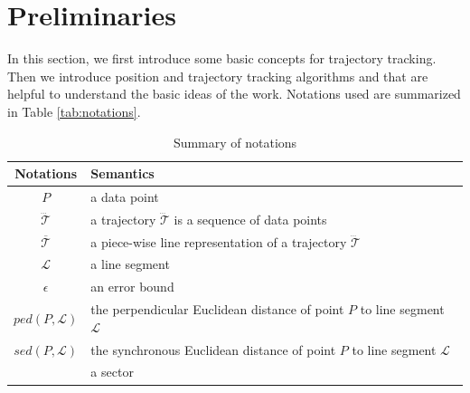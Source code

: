 



\section{Preliminaries}
\label{sec-pre}

In this section, we first introduce some basic concepts for trajectory tracking.
Then we introduce position and trajectory tracking algorithms \ldr and \ldrh that are helpful to understand the basic ideas of the work.
Notations used are summarized in Table \ref{tab:notations}.

\begin{table}
	\renewcommand{\arraystretch}{1.20}
	\caption{\small Summary of notations}
	\vspace{-1ex}
	\centering
	\footnotesize
	\begin{tabular}{|c|l|}
		\hline
		{\bf Notations}& {\bf Semantics}   \\		\hline %
		$P$ & a data point \\		\hline
		$\dddot{\mathcal{T}}$ & a trajectory $\dddot{\mathcal{T}}$ is a sequence of data points\\		\hline
		$\overline{\mathcal{T}}$&  {a piece-wise line representation of a trajectory $\dddot{\mathcal{T}}$}	\\		\hline
		$\mathcal{L}$ & a line segment  \\		\hline
		$\epsilon$ & an error bound \\		\hline
		$ped\left(P, \mathcal{L}\right)$ &  {the perpendicular Euclidean distance of point $P$ to line segment $\mathcal{L}$}	\\	\hline
		$sed\left(P, \mathcal{L}\right)$ & {the synchronous Euclidean distance of point $P$ to line segment $\mathcal{L}$} 	\\		\hline
		\sector{} & a sector \\		\hline

\end{tabular}
\end{table}

